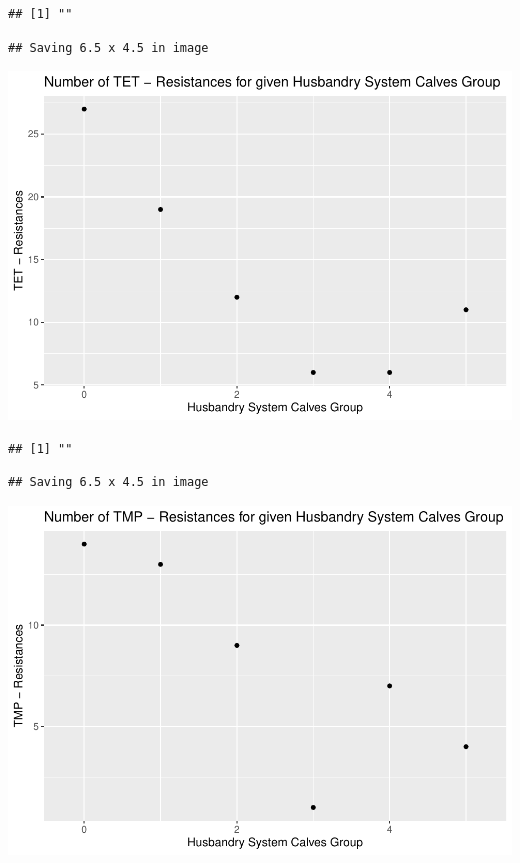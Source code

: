 \documentclass[
]{article}
\begin{document}
\begin{verbatim}
## [1] ""
\end{verbatim}

\begin{verbatim}
## Saving 6.5 x 4.5 in image
\end{verbatim}

\includegraphics{NResistenzen_files/figure-latex/binary_or_nominal_variables-38.pdf}

\begin{verbatim}
## [1] ""
\end{verbatim}

\begin{verbatim}
## Saving 6.5 x 4.5 in image
\end{verbatim}

\includegraphics{NResistenzen_files/figure-latex/binary_or_nominal_variables-39.pdf}
\end{document}
